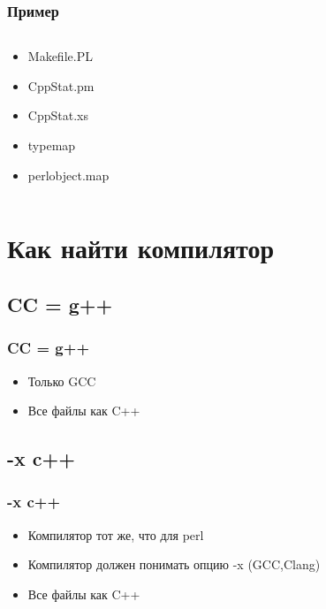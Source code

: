 \documentclass[utf8x,smaller]{beamer}
\begin{document}
\begin{frame}[t,fragile]
    \frametitle{Пример}
    \begin{columns}[t]
        \begin{column}{.3\textwidth}
            \begin{itemize}
                \item<alert@1> Makefile.PL
                \item<alert@2> CppStat.pm
                \item<alert@3-5> CppStat.xs
                \item typemap
                \item perlobject.map
            \end{itemize}
        \end{column}
        \begin{column}{.8\textwidth}
            \only<1>{  }
            \only<2>{  }
        \end{column}
    \end{columns}
\end{frame}


\section{Как найти компилятор}

\subsection{CC = g++}
\begin{frame}[fragile]
    \frametitle{CC = g++}
    
    \begin{itemize}
        \item Только GCC
        \item Все файлы как C++
    \end{itemize}
\end{frame}

\subsection{-x c++}
\begin{frame}[fragile]
    \frametitle{-x c++}
    
    \begin{itemize}
        \item Компилятор тот же, что для perl
        \item Компилятор должен понимать опцию -x (GCC,Clang)
        \item Все файлы как C++
    \end{itemize}
\end{frame}
\end{document}

